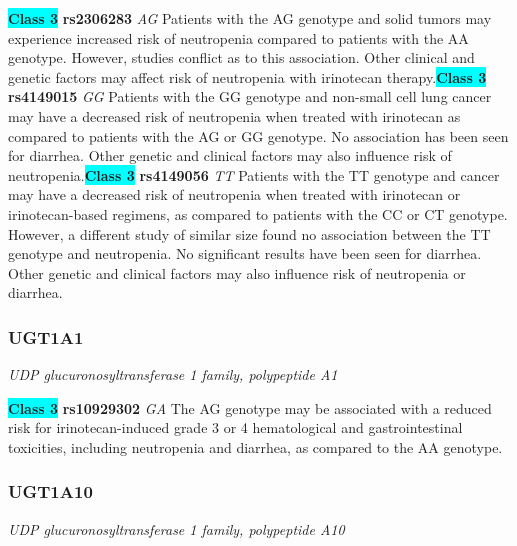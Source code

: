\documentclass{report}
\begin{document}
\textbf{\colorbox{cyan} {Class 3}} \textbf{ rs2306283 } \textit{ AG }
Patients with the AG genotype and solid tumors may experience increased risk of neutropenia compared to patients with the AA genotype. However, studies conflict as to this association. Other clinical and genetic factors may affect risk of neutropenia with irinotecan therapy.\newline\textbf{\colorbox{cyan} {Class 3}} \textbf{ rs4149015 } \textit{ GG }
Patients with the GG genotype and non-small cell lung cancer may have a decreased risk of neutropenia when treated with irinotecan as compared to patients with the AG or GG genotype. No association has been seen for diarrhea. Other genetic and clinical factors may also influence risk of neutropenia.\newline\textbf{\colorbox{cyan} {Class 3}} \textbf{ rs4149056 } \textit{ TT }
Patients with the TT genotype and cancer may have a decreased risk of neutropenia when treated with irinotecan or irinotecan-based regimens, as compared to patients with the CC or CT genotype. However, a different study of similar size found no association between the TT genotype and neutropenia. No significant results have been seen for diarrhea. Other genetic and clinical factors may also influence risk of neutropenia or diarrhea.\newline\subsubsection{ UGT1A1 }
\textit{ UDP glucuronosyltransferase 1 family, polypeptide A1 }

\textbf{\colorbox{cyan} {Class 3}} \textbf{ rs10929302 } \textit{ GA }
The AG genotype may be associated with a reduced risk for irinotecan-induced grade 3 or 4 hematological and gastrointestinal toxicities, including neutropenia and diarrhea, as compared to the AA genotype. \newline\subsubsection{ UGT1A10 }
\textit{ UDP glucuronosyltransferase 1 family, polypeptide A10 }
\end{document}
